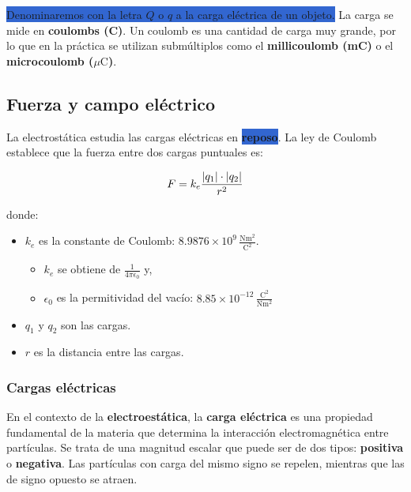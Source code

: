 \colorbox{highlight}{Denominaremos con la letra \( Q \) o \( q \) a la carga eléctrica de un objeto.} La carga se mide en \textbf{coulombs (C)}. Un coulomb es una cantidad de carga muy grande, por lo que en la práctica se utilizan submúltiplos como el \textbf{millicoulomb (mC)} o el \textbf{microcoulomb (\( \mu \text{C} \))}.

\subsection{Fuerza y campo eléctrico}

La electrostática estudia las cargas eléctricas en \colorbox{highlight}{\textbf{reposo}}. La ley de Coulomb establece que la fuerza entre dos cargas puntuales es:

\begin{equation}
    F = k_e \frac{\abs{q_1} \cdot \abs{q_2}}{r^2}
\end{equation}

donde:

\begin{itemize}
    \item \( k_e \) es la constante de Coulomb: \( 8.9876 \times 10^9 \, \frac{\si{\newton\meter\squared}}{\si{\coulomb\squared}} \).
    \begin{itemize}
        \item \( k_e \) se obtiene de  \( \frac{1}{4\pi\epsilon_0} \) y,
        \item \( \epsilon_0 \) es la permitividad del vacío: \( 8.85 \times 10^{-12} \,\frac{\si{\coulomb\squared}}{\si{\newton\meter\squared}} \)
    \end{itemize}
    \item \( q_1 \) y \( q_2 \) son las cargas.
    \item \( r \) es la distancia entre las cargas.
\end{itemize}

\subsubsection{Cargas eléctricas}

En el contexto de la \textbf{electroestática}, la \textbf{carga eléctrica} es una propiedad fundamental de la materia que determina la interacción electromagnética entre partículas. Se trata de una magnitud escalar que puede ser de dos tipos: \textbf{positiva} o \textbf{negativa}. Las partículas con carga del mismo signo se repelen, mientras que las de signo opuesto se atraen.

